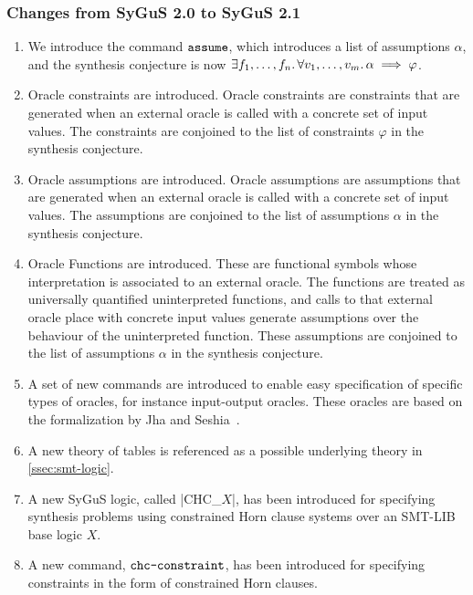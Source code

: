 \documentclass[english,a4paper,10pt]{article}
\begin{document}
\subsubsection{Changes from SyGuS 2.0 to SyGuS 2.1}
\begin{enumerate}
\item We introduce the command $\texttt{assume}$, which introduces a list of assumptions $\alpha$, and the 
synthesis conjecture is now 
$\exists f_1, \ldots, f_n \ldotp \forall v_1, \ldots, v_m \ldotp \alpha \implies \varphi$. 

\item Oracle constraints are introduced. Oracle constraints are constraints that are generated when an external oracle is called with a concrete set of input values. The constraints are conjoined to the list of constraints $\varphi$ in the synthesis conjecture.

\item Oracle assumptions are introduced. Oracle assumptions are assumptions that are generated when an external oracle is called with a concrete set of input values. The assumptions are conjoined to the list of assumptions $\alpha$ in the synthesis conjecture.

\item Oracle Functions are introduced. These are functional symbols whose interpretation is associated to an external oracle. The functions are treated as universally quantified uninterpreted functions, and calls to that external oracle place with concrete input values generate assumptions over the behaviour of the uninterpreted function. These assumptions are conjoined to the list of assumptions $\alpha$ in the synthesis conjecture.

\item A set of new commands are introduced to enable easy specification of specific types of oracles, for instance input-output oracles. These oracles are based on the formalization by Jha and Seshia~\cite{oracles}.

\item A new theory of tables is referenced as a possible underlying theory in \cref{ssec:smt-logic}.

\item A new SyGuS logic, called \code|CHC_$X$|,
has been introduced for specifying synthesis problems using constrained Horn clause systems
over an SMT-LIB base logic $X$.

\item A new command, $\texttt{chc-constraint}$, has been introduced for specifying constraints in the form of constrained Horn clauses.


\end{enumerate}
\end{document}
